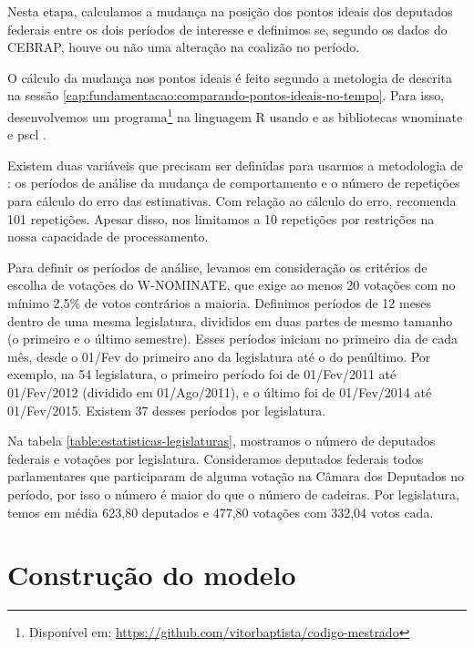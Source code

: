 \documentclass[a4paper,titlepage]{ppgi}\usepackage[]{graphicx}\usepackage[]{color}
\begin{document}
Nesta etapa, calculamos a mudança na posição dos pontos ideais dos deputados
federais entre os dois períodos de interesse e definimos se, segundo os dados
do \gls{CEBRAP}, houve ou não uma alteração na coalizão no período.

O cálculo da mudança nos pontos ideais é feito segundo a metologia de
 descrita na sessão
\ref{cap:fundamentacao:comparando-pontos-ideais-no-tempo}. Para isso,
desenvolvemos um programa\footnote{Disponível em:
\url{https://github.com/vitorbaptista/codigo-mestrado}} na linguagem R usando e
as bibliotecas wnominate e pscl \cite{R,R:wnominate,R:pscl}.

Existem duas variáveis que precisam ser definidas para usarmos a metodologia de
\citeauthor{Poole2005}: os períodos de análise da mudança de comportamento e o
número de repetições para cálculo do erro das estimativas. Com relação ao
cálculo do erro, \citeauthor{Poole2005} recomenda 101 repetições. Apesar disso,
nos limitamos a 10 repetições por restrições na nossa capacidade de
processamento.

Para definir os períodos de análise, levamos em consideração os critérios de
escolha de votações do W-NOMINATE, que exige ao menos 20 votações com no mínimo
2,5\% de votos contrários a maioria. Definimos períodos de 12 meses dentro de
uma mesma legislatura, divididos em duas partes de mesmo tamanho (o primeiro e
o último semestre). Esses períodos iniciam no primeiro dia de cada mês, desde o
01/Fev do primeiro ano da legislatura até o do penúltimo. Por exemplo, na
54\textordfeminine{} legislatura, o primeiro período foi de 01/Fev/2011 até
01/Fev/2012 (dividido em 01/Ago/2011), e o último foi de 01/Fev/2014 até
01/Fev/2015. Existem 37 desses períodos por legislatura.

Na tabela \ref{table:estatisticas-legislaturas}, mostramos o número de
deputados federais e votações por legislatura. Consideramos deputados federais
todos parlamentares que participaram de alguma votação na Câmara dos Deputados
no período, por isso o número é maior do que o número de cadeiras. Por
legislatura, temos em média 623,80 deputados e
477,80 votações com 332,04 votos cada.

\section{Construção do modelo}

\end{document}
